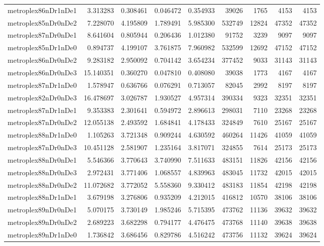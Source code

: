 \begin{longtable}{|l|r|r|r|r|r|r|r|r|}
metroplex86nDr1nDe1 & 3.313283 & 0.308461 & 0.046472 & 0.354933 & 39026 & 1765 & 4153 & 4153 \\
metroplex85nDr0nDe2 & 7.228070 & 4.195809 & 1.789491 & 5.985300 & 532749 & 12824 & 47352 & 47352 \\
metroplex87nDr0nDe1 & 8.641604 & 0.805944 & 0.206436 & 1.012380 & 91752 & 3239 & 9097 & 9097 \\
metroplex85nDr1nDe0 & 0.894737 & 4.199107 & 3.761875 & 7.960982 & 532599 & 12692 & 47152 & 47152 \\
metroplex86nDr0nDe2 & 9.283182 & 2.950092 & 0.704142 & 3.654234 & 377452 & 9033 & 31143 & 31143 \\
metroplex86nDr0nDe3 & 15.140351 & 0.360270 & 0.047810 & 0.408080 & 39038 & 1773 & 4167 & 4167 \\
metroplex87nDr1nDe0 & 1.578947 & 0.636766 & 0.076291 & 0.713057 & 82045 & 2992 & 8197 & 8197 \\
metroplex82nDr0nDe3 & 16.478697 & 3.026787 & 1.930527 & 4.957314 & 390334 & 9323 & 32351 & 32351 \\
metroplex87nDr1nDe1 & 9.353383 & 2.301641 & 0.594972 & 2.896613 & 298031 & 7110 & 23268 & 23268 \\
metroplex87nDr0nDe2 & 12.055138 & 2.493592 & 1.684841 & 4.178433 & 324849 & 7610 & 25167 & 25167 \\
metroplex88nDr1nDe0 & 1.105263 & 3.721348 & 0.909244 & 4.630592 & 460264 & 11426 & 41059 & 41059 \\
metroplex87nDr0nDe3 & 10.451128 & 2.581907 & 1.235164 & 3.817071 & 324855 & 7614 & 25173 & 25173 \\
metroplex88nDr0nDe1 & 5.546366 & 3.770643 & 3.740990 & 7.511633 & 483151 & 11826 & 42156 & 42156 \\
metroplex88nDr0nDe3 & 2.972431 & 3.771406 & 1.068557 & 4.839963 & 483045 & 11732 & 42015 & 42015 \\
metroplex88nDr0nDe2 & 11.072682 & 3.772052 & 5.558360 & 9.330412 & 483183 & 11854 & 42198 & 42198 \\
metroplex88nDr1nDe1 & 3.679198 & 3.276806 & 0.935209 & 4.212015 & 416812 & 10570 & 38106 & 38106 \\
metroplex89nDr0nDe1 & 5.070175 & 3.730149 & 1.985246 & 5.715395 & 473762 & 11136 & 39632 & 39632 \\
metroplex89nDr0nDe2 & 2.689223 & 3.682298 & 0.794177 & 4.476475 & 473768 & 11140 & 39638 & 39638 \\
metroplex89nDr1nDe0 & 1.736842 & 3.686456 & 0.829786 & 4.516242 & 473756 & 11132 & 39624 & 39624 \\

\end{longtable}

